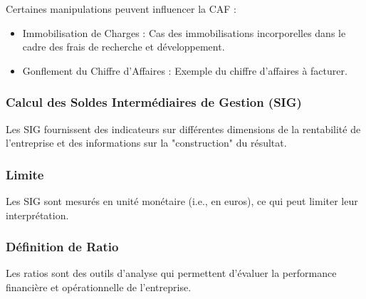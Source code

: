 \documentclass[a4paper, 12pt]{report}
\begin{document}
Certaines manipulations peuvent influencer la CAF :

\begin{itemize}
	\item Immobilisation de Charges : Cas des immobilisations incorporelles dans le cadre des frais de recherche et développement.
	\item Gonflement du Chiffre d'Affaires : Exemple du chiffre d'affaires à facturer.
\end{itemize}

\subsubsection{Calcul des Soldes Intermédiaires de Gestion (SIG)}

Les SIG fournissent des indicateurs sur différentes dimensions de la rentabilité de l'entreprise et des informations sur la "construction" du résultat. 

\subsubsection{Limite}

Les SIG sont mesurés en unité monétaire (i.e., en euros), ce qui peut limiter leur interprétation. 

\subsubsection{Définition de Ratio}

Les ratios sont des outils d'analyse qui permettent d'évaluer la performance financière et opérationnelle de l'entreprise.
\end{document}
